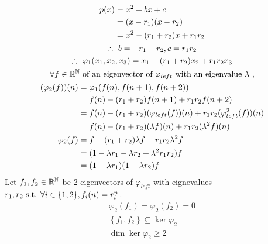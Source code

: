 \documentclass{mathtoolkit}
\begin{document}
\begin{p}
  \item
    \begin{gather*}
      \begin{aligned}
        p(x) & = x^2 + bx +c \\
             & = (x - r_1) (x - r_2) \\
             & = x^2 - (r_1 + r_2) x + r_1 r_2
      \end{aligned} \\
      \therefore b = - r_1 - r_2, c = r_1 r_2 \\
      \therefore \varphi_1(x_1, x_2, x_3) = x_1 - (r_1 + r_2) x_2 + r_1 r_2 x_3 \\
      \forall f \in \field{R}^\field{N} \text{of an eigenvector of $\varphi_{left}$ with an eigenvalue $\lambda$}, \\
      \begin{aligned}
        (\varphi_2(f))(n)
        & = \varphi_1(f(n), f(n+1), f(n+2)) \\
        & = f(n) - (r_1 + r_2) f(n+1) + r_1 r_2 f(n+2) \\
        & = f(n) - (r_1 + r_2) (\varphi_{left}(f))(n) + r_1 r_2 (\varphi_{left}^2(f))(n) \\
        & = f(n) - (r_1 + r_2) (\lambda f)(n) + r_1 r_2 (\lambda^2 f)(n) \\
        \varphi_2(f)
        & = f - (r_1 + r_2) \lambda f + r_1 r_2 \lambda^2 f \\
        & = (1 - \lambda r_1 - \lambda r_2 + \lambda^2 r_1 r_2) f \\
        & = (1 - \lambda r_1) (1 - \lambda r_2) f
      \end{aligned}
    \end{gather*}
    Let $f_1, f_2 \in \mathbb{R}^{\mathbb{N}}$ be 2 eigenvectors of $\varphi_{left}$
    with eignevalues $r_1, r_2 \st \forall i \in \{1, 2\}, f_i(n) = r_i^n$.
    \begin{gather*}
      \varphi_2(f_1) = \varphi_2(f_2) = 0 \\
      \left\{ f_1, f_2 \right\} \subseteq \ker{\varphi_2} \\
      \dim{\ker{\varphi_2}} \ge 2
    \end{gather*}


\end{p}
\end{document}
